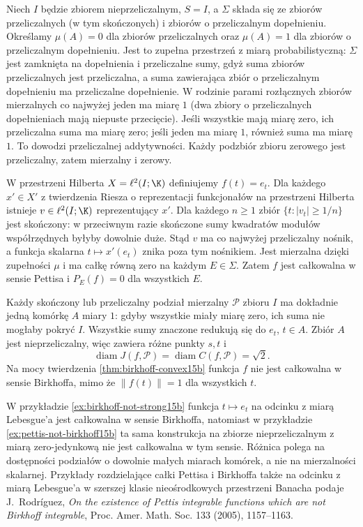 \begin{przyklad}
\label{ex:pettis-not-birkhoff15b}
Niech $I$ będzie zbiorem nieprzeliczalnym, $S=I$, a
$\Sigma$ składa się ze zbiorów przeliczalnych (w tym
skończonych) i zbiorów o przeliczalnym dopełnieniu.
Określamy $\mu(A)=0$ dla zbiorów przeliczalnych
oraz $\mu(A)=1$ dla zbiorów o przeliczalnym dopełnieniu.
Jest to zupełna przestrzeń z miarą probabilistyczną:
$\Sigma$ jest zamknięta na dopełnienia i przeliczalne
sumy, gdyż suma zbiorów przeliczalnych jest przeliczalna,
a suma zawierająca zbiór o przeliczalnym dopełnieniu
ma przeliczalne dopełnienie. W rodzinie parami
rozłącznych zbiorów mierzalnych co najwyżej jeden
ma miarę $1$ (dwa zbiory o przeliczalnych dopełnieniach
mają niepuste przecięcie). Jeśli wszystkie mają miarę
zero, ich przeliczalna suma ma miarę zero; jeśli jeden
ma miarę $1$, również suma ma miarę $1$.
To dowodzi przeliczalnej addytywności.
Każdy podzbiór zbioru zerowego jest przeliczalny,
zatem mierzalny i zerowy.

W przestrzeni Hilberta $X=\ell^2(I;\K)$ definiujemy
$f(t)=e_t$. Dla każdego $x'\in X'$ z twierdzenia
Riesza o reprezentacji funkcjonałów na przestrzeni
Hilberta istnieje $v\in\ell^2(I;\K)$ reprezentujący
$x'$. Dla każdego $n\ge1$ zbiór
$\{t:|v_t|\ge 1/n\}$ jest skończony: w przeciwnym
razie skończone sumy kwadratów modułów współrzędnych
byłyby dowolnie duże. Stąd $v$ ma co najwyżej
przeliczalny nośnik, a funkcja skalarna
$t\mapsto x'(e_t)$ znika poza tym nośnikiem.
Jest mierzalna dzięki zupełności $\mu$ i ma
całkę równą zero na każdym $E\in\Sigma$.
Zatem $f$ jest całkowalna w sensie Pettisa
i $P_E(f)=0$ dla wszystkich $E$.

Każdy skończony lub przeliczalny podział mierzalny
$\mathcal P$ zbioru $I$ ma dokładnie jedną komórkę
$A$ miary $1$: gdyby wszystkie miały miarę zero,
ich suma nie mogłaby pokryć $I$. Wszystkie sumy
znaczone redukują się do $e_t$, $t\in A$.
Zbiór $A$ jest nieprzeliczalny, więc zawiera
różne punkty $s,t$ i
\[
 \operatorname{diam}J(f,\mathcal P)
 =\operatorname{diam}C(f,\mathcal P)=\sqrt2.
\]
Na mocy twierdzenia \ref{thm:birkhoff-convex15b}
funkcja $f$ nie jest całkowalna w sensie Birkhoffa,
mimo że $\|f(t)\|=1$ dla wszystkich $t$.
\end{przyklad}

\begin{uwaga}
\label{rem:birkhoff-domain15b}
W przykładzie \ref{ex:birkhoff-not-strong15b} funkcja
$t\mapsto e_t$ na odcinku z miarą Lebesgue'a jest
całkowalna w sensie Birkhoffa, natomiast
w przykładzie \ref{ex:pettis-not-birkhoff15b} ta sama
konstrukcja na zbiorze nieprzeliczalnym z miarą
zero-jedynkową nie jest całkowalna w tym sensie.
Różnica polega na dostępności podziałów o dowolnie
małych miarach komórek, a nie na mierzalności
skalarnej. Przykłady rozdzielające całki Pettisa
i Birkhoffa także na odcinku z miarą Lebesgue'a
w szerszej klasie nieośrodkowych przestrzeni Banacha
podaje J.~Rodr\'iguez, \emph{On the existence of Pettis
integrable functions which are not Birkhoff integrable},
Proc. Amer. Math. Soc. 133 (2005), 1157--1163.
\end{uwaga}


